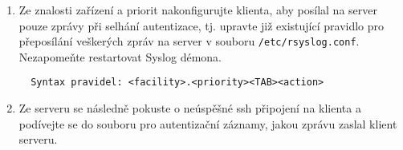 \begin{itemize}
\begin{enumerate}
         \item Ze znalosti zařízení a priorit nakonfigurujte klienta, aby posílal na server 
         pouze zprávy při selhání autentizace, tj. upravte již existující pravidlo pro přeposílání
         veškerých zpráv na server v souboru {\tt /etc/rsyslog.conf}. Nezapomeňte restartovat Syslog démona. 
         
\begin{verbatim} 
  Syntax pravidel: <facility>.<priority><TAB><action>
\end{verbatim} 
         \item Ze serveru se následně pokuste o neúspěšné ssh připojení na klienta a podívejte se
         do souboru pro autentizační záznamy, jakou zprávu zaslal klient serveru.


       \end{enumerate}
   \end{itemize}

